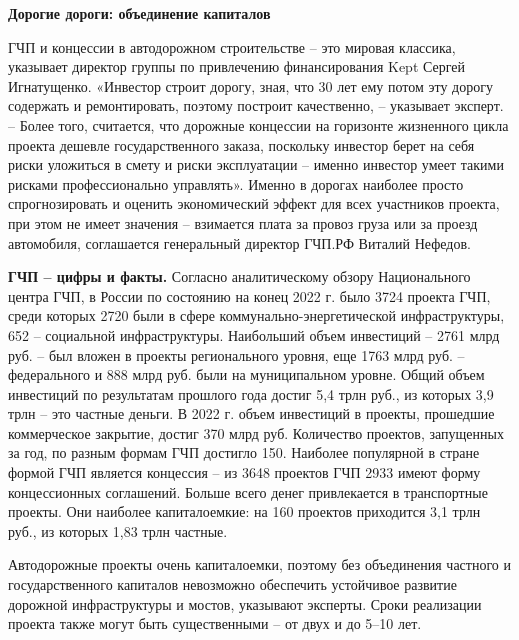 \textbf{Дорогие дороги: объединение капиталов}

ГЧП и концессии в автодорожном строительстве – это мировая классика, указывает директор группы по привлечению финансирования Kept Сергей Игнатущенко. «Инвестор строит дорогу, зная, что 30 лет ему потом эту дорогу содержать и ремонтировать, поэтому построит качественно, – указывает эксперт. – Более того, считается, что дорожные концессии на горизонте жизненного цикла проекта дешевле государственного заказа, поскольку инвестор берет на себя риски уложиться в смету и риски эксплуатации – именно инвестор умеет такими рисками профессионально управлять». Именно в дорогах наиболее просто спрогнозировать и оценить экономический эффект для всех участников проекта, при этом не имеет значения – взимается плата за провоз груза или за проезд автомобиля, соглашается генеральный директор ГЧП.РФ Виталий Нефедов.

\begin{fancyquotes}
    \textbf{ГЧП – цифры и факты.} Согласно аналитическому обзору Национального центра ГЧП, в России по состоянию на конец 2022 г. было 3724 проекта ГЧП, среди которых 2720 были в сфере коммунально-энергетической инфраструктуры, 652 – социальной инфраструктуры. Наибольший объем инвестиций – 2761 млрд руб. – был вложен в проекты регионального уровня, еще 1763 млрд руб. – федерального и 888 млрд руб. были на муниципальном уровне. Общий объем инвестиций по результатам прошлого года достиг 5,4 трлн руб., из которых 3,9 трлн – это частные деньги.
    В 2022 г. объем инвестиций в проекты, прошедшие коммерческое закрытие, достиг 370 млрд руб. Количество проектов, запущенных за год, по разным формам ГЧП достигло 150.
    Наиболее популярной в стране формой ГЧП является концессия – из 3648 проектов ГЧП 2933 имеют форму концессионных соглашений. Больше всего денег привлекается в транспортные проекты. Они наиболее капиталоемкие: на 160 проектов приходится 3,1 трлн руб., из которых 1,83 трлн частные.
\end{fancyquotes}



Автодорожные проекты очень капиталоемки, поэтому без объединения частного и государственного капиталов невозможно обеспечить устойчивое развитие дорожной инфраструктуры и мостов, указывают эксперты. Сроки реализации проекта также могут быть существенными – от двух и до 5–10 лет.

